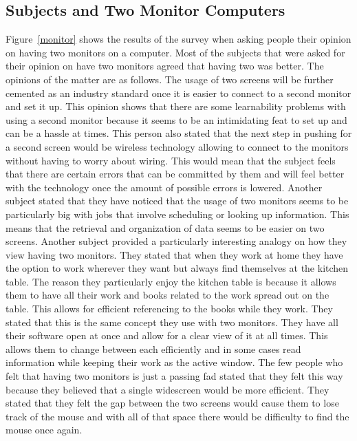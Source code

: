 \documentclass[11pt]{article}
\begin{document}
\subsection{Subjects and Two Monitor Computers}
Figure~\ref{monitor} shows the results of the survey when asking people their opinion on having two monitors on a computer. Most of the subjects that were asked for their opinion on have two monitors agreed that having two was better. The opinions of the matter are as follows. The usage of two screens will be further cemented as an industry standard once it is easier to connect to a second monitor and set it up. This opinion shows that there are some learnability problems with using a second monitor because it seems to be an intimidating feat to set up and can be a hassle at times. This person also stated that the next step in pushing for a second screen would be wireless technology allowing to connect to the monitors without having to worry about wiring. %
This would mean that the subject feels that there are certain errors that can be committed by them and will feel better with the technology once the amount of possible errors is lowered. Another subject stated that they have noticed that the usage of two monitors seems to be particularly big with jobs that involve scheduling or looking up information. This means that the retrieval and organization of data seems to be easier on two screens. Another subject provided a particularly interesting analogy on how they view having two monitors. They stated that when they work at home they have the option to work wherever they want but always find themselves at the kitchen table. The reason they particularly enjoy the kitchen table is because it allows them to have all their work and books related to the work spread out on the table. This allows for efficient referencing to the books while they work. They stated that this is the same concept they use with two monitors. They have all their software open at once and allow for a clear view of it at all times. This allows them to change between each efficiently and in some cases read information while keeping their work as the active window. The few people who felt that having two monitors is just a passing fad stated that they felt this way because they believed that a single widescreen would be more efficient. They stated that they felt the gap between the two screens would cause them to lose track of the mouse and with all of that space there would be difficulty to find the mouse once again.
\end{document}
